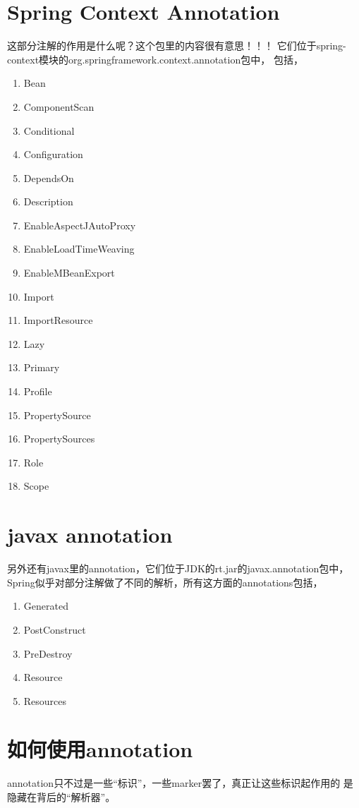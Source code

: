 \documentclass[a4paper,11pt]{article}
\begin{document}
\section[Spring Context Annotation]{Spring Context Annotation}
这部分注解的作用是什么呢？这个包里的内容很有意思！！！
它们位于spring-context模块的org.springframework.context.annotation包中，
包括，
\begin{enumerate}
\item Bean
\item ComponentScan
\item Conditional
\item Configuration
\item DependsOn
\item Description
\item EnableAspectJAutoProxy
\item EnableLoadTimeWeaving
\item EnableMBeanExport
\item Import
\item ImportResource
\item Lazy
\item Primary
\item Profile
\item PropertySource
\item PropertySources
\item Role
\item Scope
\end{enumerate}

\section[javax annotation]{javax annotation}
另外还有javax里的annotation，它们位于JDK的rt.jar的javax.annotation包中，
Spring似乎对部分注解做了不同的解析，所有这方面的annotations包括，
\begin{enumerate}
\item Generated
\item PostConstruct
\item PreDestroy
\item Resource
\item Resources
\end{enumerate}

\section[如何使用annotation]{如何使用annotation}
annotation只不过是一些“标识”，一些marker罢了，真正让这些标识起作用的
是隐藏在背后的“解析器”。
\end{document}
